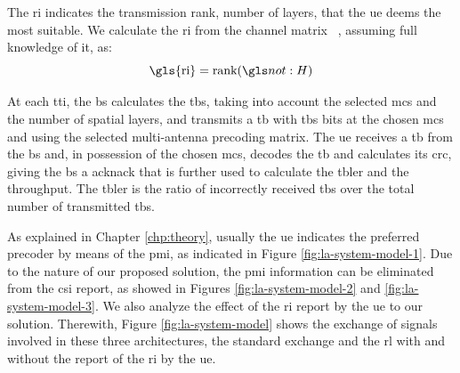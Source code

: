 The \gls{ri} indicates the transmission rank, number of layers, that the \gls{ue} deems the most suitable.
%
We calculate the \gls{ri} from the channel matrix \channel~, assuming full knowledge of it, as:
%
\begin{equation}\label{eq:la-rank}
    \textrm{\gls{ri}} = \textrm{rank} (\channel)
\end{equation}


At each \gls{tti}, the \gls{bs} calculates the \gls{tbs}, taking into account the selected \gls{mcs} and the number of spatial layers, and transmits a \gls{tb} with \gls{tbs} bits at the chosen \gls{mcs} and using the selected multi-antenna precoding matrix.
%
The \gls{ue} receives a \gls{tb} from the \gls{bs} and, in possession of the chosen \gls{mcs}, decodes the \gls{tb} and calculates its \gls{crc}, giving the \gls{bs} a \gls{acknack} that is further used to calculate the \gls{tbler} and the throughput.
%
The \gls{tbler} is the ratio of incorrectly received \gls{tb}s over the total number of transmitted \gls{tb}s.
%
%

As explained in Chapter \ref{chp:theory}, usually the \gls{ue} indicates the preferred precoder by means of the \gls{pmi}, as indicated in Figure \ref{fig:la-system-model-1}.
%
Due to the nature of our proposed solution, the \gls{pmi} information can be eliminated from the \gls{csi} report, as showed in Figures \ref{fig:la-system-model-2} and \ref{fig:la-system-model-3}.
%
We also analyze the effect of the \gls{ri} report by the \gls{ue} to our solution.
%
Therewith, Figure \ref{fig:la-system-model} shows the exchange of signals involved in these three architectures, the standard exchange and the \gls{rl} with and without the report of the \gls{ri} by the \gls{ue}.

